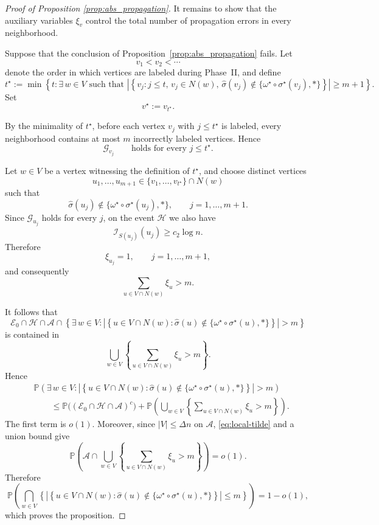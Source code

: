 \documentclass[11pt, a4paper]{amsart}
\newcommand{\1}{\mathbf{1}}
\theoremstyle{definition}
\theoremstyle{remark}
\theoremstyle{definition}
\begin{document}
\begin{proof}[Proof of Proposition \ref{prop:abs_propagation}]
It remains to show that the auxiliary variables $\xi_v$ control the
total number of propagation errors in every neighborhood.

Suppose that the conclusion of Proposition~\ref{prop:abs_propagation}
fails. Let
\[
v_1<v_2<\cdots
\]
denote the order in which vertices are labeled during Phase~II, and define
\[
t^\star
:=
\min\left\{
t:
\exists\, w\in V
\text{ such that }
\left|
\left\{
v_j:
j\le t,\,
v_j\in N(w),\,
\widehat\sigma(v_j)
\notin
\{\omega^\star\circ\sigma^\star(v_j),*\}
\right\}
\right|
\ge m+1
\right\}.
\]
Set
\[
v^\star:=v_{t^\star}.
\]

By the minimality of $t^\star$, before each vertex $v_j$ with
$j\le t^\star$ is labeled, every neighborhood contains at most $m$
incorrectly labeled vertices. Hence
\[
\mathcal G_{v_j}
\qquad\text{holds for every }j\le t^\star.
\]

Let $w\in V$ be a vertex witnessing the definition of $t^\star$, and
choose distinct vertices
\[
u_1,\ldots,u_{m+1}\in
\{v_1,\ldots,v_{t^\star}\}\cap N(w)
\]
such that
\[
\widehat\sigma(u_j)
\notin
\{\omega^\star\circ\sigma^\star(u_j),*\},
\qquad
j=1,\ldots,m+1.
\]
Since $\mathcal G_{u_j}$ holds for every $j$, on the event $\mathcal H$
we also have
\[
\mathcal I_{S(u_j)}(u_j)\ge c_2\log n.
\]
Therefore
\[
\xi_{u_j}=1,
\qquad
j=1,\ldots,m+1,
\]
and consequently
\[
\sum_{u\in V\cap N(w)}\xi_u>m.
\]

It follows that
\[
\mathcal E_0\cap\mathcal H\cap\mathcal A
\cap
\left\{
\exists\,w\in V:
\left|
\left\{
u\in V\cap N(w):
\widehat\sigma(u)
\notin
\{\omega^\star\circ\sigma^\star(u),*\}
\right\}
\right|
>m
\right\}
\]
is contained in
\[
\bigcup_{w\in V}
\left\{
\sum_{u\in V\cap N(w)}\xi_u>m
\right\}.
\]
Hence
\begin{align*}
&\mathbb P\left(
\exists\,w\in V:
\left|
\left\{
u\in V\cap N(w):
\widehat\sigma(u)
\notin
\{\omega^\star\circ\sigma^\star(u),*\}
\right\}
\right|
>m
\right)
\\
&\qquad\le
\mathbb P\bigl(
(\mathcal E_0\cap\mathcal H\cap\mathcal A)^c
\bigr)
+
\mathbb P\left(
\bigcup_{w\in V}
\left\{
\sum_{u\in V\cap N(w)}\xi_u>m
\right\}
\right).
\end{align*}
The first term is $o(1)$. Moreover, since $|V|\le \Delta n$ on
$\mathcal A$, \eqref{eq:local-tilde} and a union bound give
\[
\mathbb P\left(\mathcal A \cap
\bigcup_{w\in V}
\left\{
\sum_{u\in V\cap N(w)}\xi_u>m
\right\}
\right)
=o(1).
\]
Therefore
\[
\mathbb P\left(
\bigcap_{w\in V}
\left\{
\left|
\left\{
u\in V\cap N(w):
\widehat\sigma(u)
\notin
\{\omega^\star\circ\sigma^\star(u),*\}
\right\}
\right|
\le m
\right\}
\right)
=
1-o(1),
\]
which proves the proposition.
\end{proof}
\end{document}
